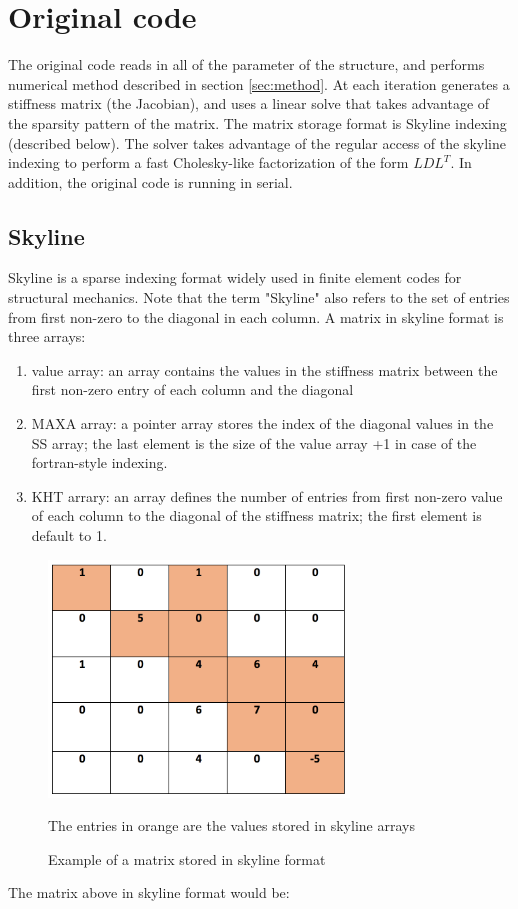 \documentclass[11pt]{article}
\begin{document}
\section{Original code}\label{sec:originalCode}
The original code reads in all of the parameter of the structure, and performs numerical method described in section \ref{sec:method}. At each iteration generates a stiffness matrix (the Jacobian), and uses a linear solve that takes advantage of the sparsity pattern of the matrix. The matrix storage format is Skyline indexing (described below). The solver takes advantage of the regular access of the skyline indexing to perform a fast Cholesky-like factorization of the form $LDL^T$. In addition, the original code is running in serial.


\subsection{Skyline}
Skyline is a sparse indexing format widely used in finite element codes for structural mechanics. Note that the term "Skyline" also refers to the set of entries from first non-zero to the diagonal in each column. A matrix in skyline format is three arrays: 
\begin{enumerate}

\item value array: an array contains the values in the stiffness matrix between the first non-zero entry of each column and the diagonal
\item MAXA array: a  pointer array stores the index of the diagonal values in the SS array; the last element is the size of the value array +1 in case of the fortran-style indexing.
\item KHT arrary: an array defines the number of entries from first non-zero value of each column to the diagonal of the stiffness matrix; the first element is default to 1. 
\end{enumerate}

\begin{figure}[h]
\begin{center}

\includegraphics[width=8cm]{skyline}
\label{fig:skyline}\\
\caption{Example of a matrix stored in skyline format}
The entries in orange are the values stored in skyline arrays
\end{center}

\end{figure}
The matrix above in skyline format would be:
\end{document}
